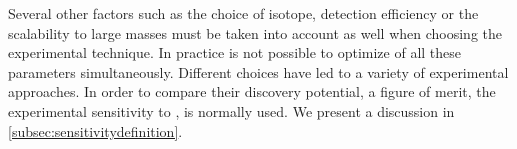 % 

Several other factors such as the choice of isotope, detection efficiency or the scalability to large masses must be taken into account as well when choosing the experimental technique. In practice is not possible to optimize of all these parameters simultaneously. Different choices have led to a variety of experimental approaches. In order to compare their discovery potential, a figure of merit, the experimental sensitivity to \mbb, is normally used. We present a discussion in \ref{subsec:sensitivitydefinition}. 

